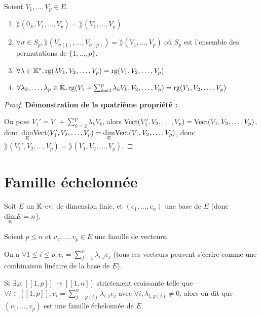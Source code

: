 \documentclass[12pt, a4paper]{report}
\begin{document}
\begin{property}
    Soient $V_1,\dots,V_p \in E$.

    \begin{enumerate}
        \item $\rang(0_E,V_1,\dots,V_p) = \rang(V_1,\dots,V_p)$
        \item $\forall \sigma \in S_p, \rang(V_{\sigma(1)},\dots,V_{\sigma(p)}) = \rang(V_1,\dots,V_p)$ où $S_p$ est l'ensemble des permutations de $\{1,\dots,p\}$.
        \item $\forall \lambda \in \mathbb{K}^*, \mathrm{rg}(\lambda V_1,V_2,\dots,V_p) = \mathrm{rg}(V_1,V_2,\dots,V_p)$
        \item $\forall \lambda_2,\dots,\lambda_p \in \mathbb{K}, \mathrm{rg}(V_1 + \sum_{k=2}^p \lambda_k V_k, V_2,\dots,V_p) = \mathrm{rg}(V_1,V_2,\dots,V_p)$
    \end{enumerate}
\end{property}

\begin{proof}
    \textbf{Démonstration de la quatrième propriété :}

    On pose $V_1' = V_1 + \sum_{k=2}^p \lambda_k V_k$, alors $\mathrm{Vect}(V_1',V_2,\dots,V_p) = \mathrm{Vect}(V_1,V_2,\dots,V_p)$, donc $\underset{\mathbb{K}}\dim \mathrm{Vect}(V_1',V_2,\dots,V_p) = \underset{\mathbb{K}}\dim \mathrm{Vect}(V_1,V_2,\dots,V_p)$, donc $\rang(V_1',V_2,\dots,V_p) = \rang(V_1,V_2,\dots,V_p)$.
\end{proof}

\section{Famille échelonnée}

\begin{definition}
    Soit $E$ un $\mathbb{K}$-ev. de dimension finie, et $(e_1,\dots,e_n)$ une base de $E$ (donc $\underset{\mathbb{K}}\dim E = n$).

    Soient $p\le n$ et $v_1,\dots,v_p \in E$ une famille de vecteurs.

    On a $\forall 1 \le i \le p, v_i = \sum_{j=1}^n \lambda_{i,j} e_j$ (tous ces vecteurs peuvent s'écrire comme une combinaison linéaire de la base de $E$).

    Si $\exists \varphi : [\![1,p]\!] \to [\![1,n]\!]$ strictement croissante telle que $\forall i \in [\![1,p]\!], v_i = \sum_{j=\varphi(i)}^{n} \lambda_{i,j} e_j$ avec $\forall i, \lambda_{i,\varphi(i)} \ne 0$, alors on dit que $(v_1,\dots,v_p)$ est une famille échelonnée de $E$.
\end{definition}
\end{document}
